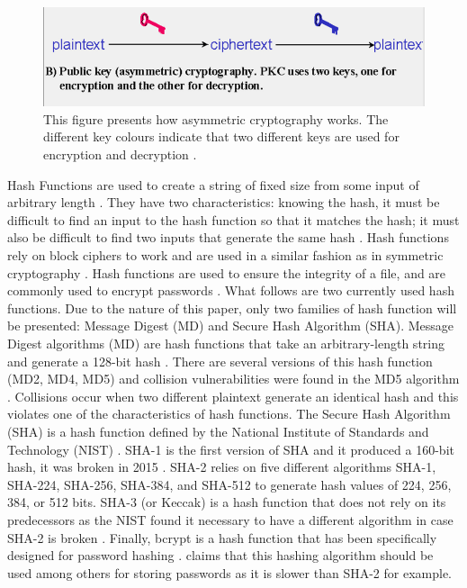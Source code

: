 \documentclass{l4proj}
\begin{document}
\begin{figure}[]
    \centering
    \includegraphics[width=\textwidth]{images/AsymEnc.PNG}
    \caption{This figure presents how asymmetric cryptography works.
    The different key colours indicate that two different keys are used for encryption and decryption 
    \citep{kessler_overview_2016}.}
    \label{fig:asym}
\end{figure}

Hash Functions are used to create a string of fixed size from some input of arbitrary length \citep{savage_cse_2019}. 
They have two characteristics: knowing the hash, it must be difficult to find an input to the hash function so that it matches the hash;
it must also be difficult to find two inputs that generate the same hash \citep{savage_cse_2019}. 
Hash functions rely on block ciphers to work and are used in a similar fashion as in symmetric cryptography \citep{anderson_security_2008}. 
Hash functions are used to ensure the integrity of a file, and are commonly used to encrypt passwords \citep{kessler_overview_2016}. What follows are two currently used hash functions. 
Due to the nature of this paper, only two families of hash function will be presented: Message Digest (MD) and Secure Hash Algorithm (SHA).
Message Digest algorithms (MD) are hash functions that take an arbitrary-length string and generate a 128-bit hash \citep{kessler_overview_2016}.
There are several versions of this hash function (MD2, MD4, MD5) and collision vulnerabilities were found in the MD5 algorithm \citep{kessler_overview_2016}.
Collisions occur when two different plaintext generate an identical hash and this violates one of the characteristics of hash functions.
The Secure Hash Algorithm (SHA) is a hash function defined by the National Institute of Standards and Technology (NIST) \citep{kessler_overview_2016}. 
SHA-1 is the first version of SHA and it produced a 160-bit hash, it was broken in 2015 \citep{kessler_overview_2016}. SHA-2 relies on five different algorithms
SHA-1, SHA-224, SHA-256, SHA-384, and SHA-512 to generate hash values of 224, 256, 384, or 512 bits. 
SHA-3 (or Keccak) is a hash function that does not rely on its predecessors as the NIST found it necessary to have a different algorithm in case SHA-2 is broken \citep{kessler_overview_2016}.
Finally, bcrypt is a hash function that has been specifically designed for password hashing \citep{noauthor_1999_nodate}. 
\citet{savage_cse_2019-2} claims that this hashing algorithm should be used among others for storing passwords as it is slower than SHA-2 for example.
\end{document}
